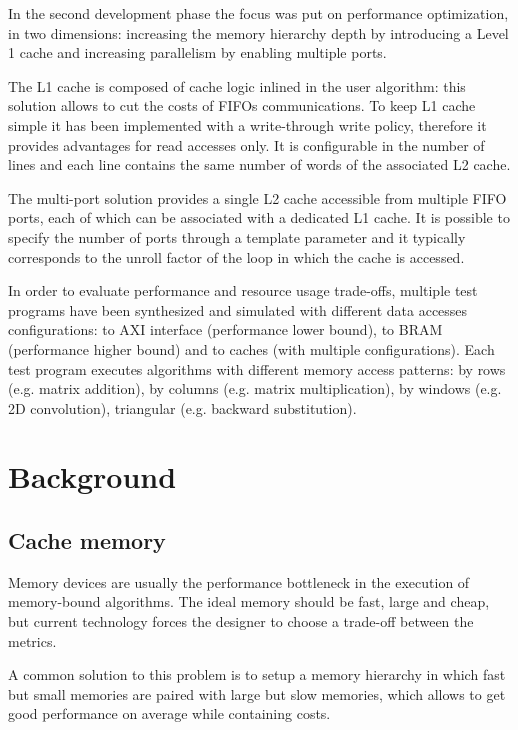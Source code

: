 \documentclass[11pt,a4paper]{memoir}
\begin{document}
\bigskip
In the second development phase the focus was put on performance optimization,
in two dimensions: increasing the memory hierarchy depth by introducing a Level
1 cache and increasing parallelism by enabling multiple ports.

The L1 cache is composed of cache logic inlined in the user algorithm: this
solution allows to cut the costs of FIFOs communications. To keep L1 cache
simple it has been implemented with a write-through write policy, therefore
it provides advantages for read accesses only. It is configurable in the
number of lines and each line contains the same number of words of the
associated L2 cache.

The multi-port solution provides a single L2 cache accessible from multiple
FIFO ports, each of which can be associated with a dedicated L1 cache.
It is possible to specify the number of ports through a template parameter and
it typically corresponds to the unroll factor of the loop in which the cache
is accessed.

\bigskip
In order to evaluate performance and resource usage trade-offs, multiple test
programs have been synthesized and simulated with different data accesses
configurations: to AXI interface (performance lower bound), to BRAM
(performance higher bound) and to caches (with multiple configurations).
Each test program executes algorithms with different memory access patterns: by
rows (e.g.  matrix addition), by columns (e.g. matrix multiplication), by
windows (e.g. 2D convolution), triangular (e.g. backward substitution).

\vfill

\pagebreak
\tableofcontents*

\mainmatter
\chapter{Background}
\section{Cache memory}
Memory devices are usually the performance bottleneck in the execution of
memory-bound algorithms.
The ideal memory should be fast, large and cheap, but current technology forces
the designer to choose a trade-off between the metrics.

A common solution to this problem is to setup a memory hierarchy in
which fast but small memories are paired with large but slow memories, which
allows to get good performance on average while containing costs.
\end{document}
